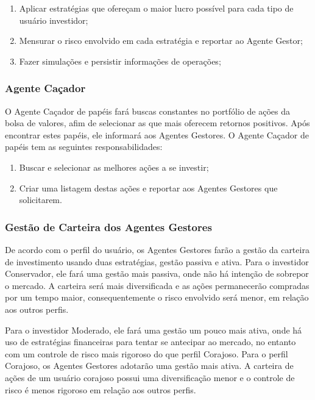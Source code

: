 \begin{enumerate}
\item Aplicar estratégias que ofereçam o maior lucro possível para cada tipo de usuário investidor;
\item Mensurar o risco envolvido em cada estratégia e reportar ao Agente Gestor;
\item Fazer simulações e persistir informações de operações;
\end{enumerate}

\subsubsection{Agente Caçador}

O Agente Caçador de papéis fará buscas constantes no portfólio de ações da bolsa  de valores, afim de selecionar as que mais oferecem retornos positivos. Após encontrar estes papéis, ele informará aos Agentes Gestores. O Agente Caçador de papéis tem as seguintes responsabilidades: 
\begin{enumerate}
\item Buscar e selecionar as melhores ações a se investir;
\item Criar uma listagem destas ações e reportar aos Agentes Gestores que solicitarem.
\end{enumerate}

\subsubsection{Gestão de Carteira dos Agentes Gestores}

De acordo com o perfil do usuário, os Agentes Gestores farão a gestão da carteira de investimento usando duas estratégias, gestão passiva e ativa. Para o investidor Conservador, ele fará uma gestão mais passiva, onde não há intenção de sobrepor o mercado. A carteira será mais diversificada e as ações permanecerão compradas por um tempo maior, consequentemente o risco envolvido será menor, em relação aos outros perfis.

Para o investidor Moderado, ele fará uma gestão um pouco mais ativa, onde há uso de estratégias financeiras para tentar se antecipar ao mercado, no entanto com um controle de risco mais rigoroso do que perfil Corajoso. Para o perfil Corajoso, os Agentes Gestores adotarão uma gestão mais ativa. A carteira de ações de um usuário corajoso possui uma diversificação menor e o controle de risco é menos rigoroso em relação aos outros perfis.

